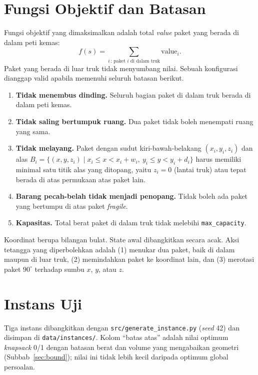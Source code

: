\section{Fungsi Objektif dan Batasan}

Fungsi objektif yang dimaksimalkan adalah total \textit{value} paket yang berada di
dalam peti kemas:
\begin{equation}
	f(s) = \sum_{i \,:\, \text{paket } i \text{ di dalam truk}} \text{value}_i .
\end{equation}
Paket yang berada di luar truk tidak menyumbang nilai. Sebuah konfigurasi dianggap
valid apabila memenuhi seluruh batasan berikut.

\begin{enumerate}
	\item \textbf{Tidak menembus dinding.} Seluruh bagian paket di dalam truk berada di dalam peti kemas.
	\item \textbf{Tidak saling bertumpuk ruang.} Dua paket tidak boleh menempati ruang yang sama.
	\item \textbf{Tidak melayang.} Paket dengan sudut kiri-bawah-belakang $(x_i,y_i,z_i)$ dan alas
	$B_i=\{(x,y,z_i)\mid x_i\le x<x_i+w_i,\ y_i\le y<y_i+d_i\}$ harus memiliki minimal satu titik
	alas yang ditopang, yaitu $z_i=0$ (lantai truk) atau tepat berada di atas permukaan atas paket lain.
	\item \textbf{Barang pecah-belah tidak menjadi penopang.} Tidak boleh ada paket yang bertumpu di atas paket \textit{fragile}.
	\item \textbf{Kapasitas.} Total berat paket di dalam truk tidak melebihi \texttt{max\_capacity}.
\end{enumerate}

Koordinat berupa bilangan bulat. State awal dibangkitkan secara acak. Aksi tetangga yang
diperbolehkan adalah (1) menukar dua paket, baik di dalam maupun di luar truk,
(2) memindahkan paket ke koordinat lain, dan (3) merotasi paket $90^\circ$ terhadap
sumbu $x$, $y$, atau $z$.

\section{Instans Uji}

Tiga instans dibangkitkan dengan \texttt{src/generate\_instance.py} (\textit{seed} 42) dan
disimpan di \texttt{data/instances/}. Kolom ``batas atas'' adalah nilai optimum
\textit{knapsack} 0/1 dengan batasan berat dan volume yang mengabaikan geometri
(Subbab~\ref{sec:bound}); nilai ini tidak lebih kecil daripada optimum global persoalan.

